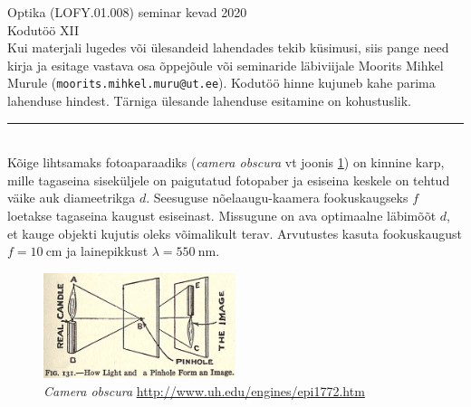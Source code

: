 \documentclass[11pt]{article}
\newcommand{\yl}[1]{\noindent{\bf Ülesanne #1} \quad}
\begin{document}
{\small Optika (LOFY.01.008) seminar \hfill kevad 2020}\\

{\Large Kodutöö XII}\\

Kui materjali lugedes või ülesandeid lahendades tekib küsimusi, siis pange need kirja ja esitage vastava osa õppejõule või seminaride läbiviijale Moorits Mihkel Murule (\texttt{moorits.mihkel.muru@ut.ee}). Kodutöö hinne kujuneb kahe parima lahenduse hindest. Tärniga ülesande lahenduse esitamine on kohustuslik.

\rule{\linewidth}{1pt} \\

\yl{1} Kõige lihtsamaks fotoaparaadiks (\textit{camera obscura} vt joonis \ref{cam}) on kinnine karp, mille tagaseina siseküljele on paigutatud fotopaber ja esiseina keskele on tehtud väike auk diameetrikga \(d\). Seesuguse nõelaaugu-kaamera fookuskaugseks \(f\) loetakse tagaseina kaugust esiseinast. Missugune on ava optimaalne läbimõõt \(d\), et kauge objekti kujutis oleks võimalikult terav. Arvutustes kasuta fookuskaugust \(f=\SI{10}{\centi\meter}\) ja lainepikkust \(\lambda=\SI{550}{\nano\meter}\).\\

\begin{figure}[!h]
	\centering
	\includegraphics[width=0.5\textwidth]{camobs.jpg}
	\caption{\textit{Camera obscura} \small \url{http://www.uh.edu/engines/epi1772.htm}}
	\label{cam}
\end{figure}
\end{document}
